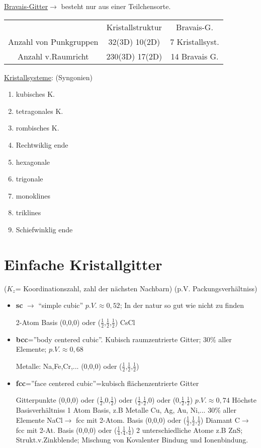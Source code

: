 \underline{Bravais-Gitter}\(\rightarrow\) besteht nur aus einer Teilchensorte.

\begin{tabular}{ccc}
&Kristallstruktur&Bravais-G.\\
Anzahl von Punkgruppen& 32(3D) 10(2D)& 7 Kristallsyst.\\
Anzahl v.Raumricht&230(3D) 17(2D)&14 Bravais G.
\end{tabular}

\underline{Kristallsysteme}: (Syngonien)
\begin{enumerate}
\item kubisches K.
\item tetragonales K.
\item rombisches K.
\item Rechtwiklig ende
\item hexagonale
\item trigonale
\item monoklines
\item triklines
\item Schiefwinklig ende
\end{enumerate}



\section{Einfache Kristallgitter} 
(\(K_z\)= Koordinationszahl, zahl der nächsten Nachbarn)
(p.V. Packungsverhältniss)

\begin{itemize}
\item \textbf{sc} \(\rightarrow\) ``simple cubic'' \(p.V.\approx 0,52\); In der natur so gut
  wie nicht zu finden

2-Atom Basis (0,0,0) oder (\(\frac 1 2\),\(\frac 1 2\),\(\frac 1 2\))
CsCl

\item \textbf{bcc}=''body centered cubic''. Kubisch raumzentrierte Gitter; 30\%
  aller Elemente; \(p.V.\approx 0,68\)

Metalle: Na,Fe,Cr,...
 (0,0,0) oder (\(\frac 1 2\),\(\frac 1 2\),\(\frac 1 2\))
\item \textbf{fcc}=''face centered cubic''=kubisch flächenzentrierte Gitter

Gitterpunkte
 (0,0,0) oder (\(\frac 1 2\),\(0\),\(\frac 1 2\)) oder (\(\frac 1 2\),\(\frac 1 2\),0)
 oder (0,\(\frac 1 2\),\(\frac 1 2\))  \(p.V.\approx 0,74\) Höchste Basisverhältniss
1 Atom Basis, z.B Metalle Cu, Ag, Au, Ni,... 30\% aller Elemente
NaCl\(\rightarrow\) fcc mit 2-Atom. Basis (0,0,0) oder (\(\frac 1 2\),\(\frac 1
2\),\(\frac 1 2\))
Diamant C\(\rightarrow\)fcc mit 2-At. Basis (0,0,0) oder (\(\frac 1 4\),\(\frac 1
4\),\(\frac 1 4\))
2 unterschiedliche Atome z.B ZnS; Strukt.v.Zinkblende; Mischung von Kovalenter
Bindung und Ionenbindung.
\end{itemize}


